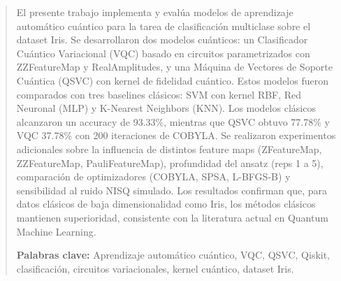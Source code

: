 \begin{abstract}
\noindent
El presente trabajo implementa y eval\'ua modelos de aprendizaje autom\'atico cu\'antico para la tarea de clasificaci\'on multiclase sobre el dataset Iris. Se desarrollaron dos modelos cu\'anticos: un Clasificador Cu\'antico Variacional (VQC) basado en circuitos parametrizados con ZZFeatureMap y RealAmplitudes, y una M\'aquina de Vectores de Soporte Cu\'antica (QSVC) con kernel de fidelidad cu\'antico. Estos modelos fueron comparados con tres baselines cl\'asicos: SVM con kernel RBF, Red Neuronal (MLP) y K-Nearest Neighbors (KNN). Los modelos cl\'asicos alcanzaron un accuracy de 93.33\%, mientras que QSVC obtuvo 77.78\% y VQC 37.78\% con 200 iteraciones de COBYLA. Se realizaron experimentos adicionales sobre la influencia de distintos feature maps (ZFeatureMap, ZZFeatureMap, PauliFeatureMap), profundidad del ansatz (reps 1 a 5), comparaci\'on de optimizadores (COBYLA, SPSA, L-BFGS-B) y sensibilidad al ruido NISQ simulado. Los resultados confirman que, para datos cl\'asicos de baja dimensionalidad como Iris, los m\'etodos cl\'asicos mantienen superioridad, consistente con la literatura actual en Quantum Machine Learning.

\vspace{0.5cm}
\noindent\textbf{Palabras clave:} Aprendizaje autom\'atico cu\'antico, VQC, QSVC, Qiskit, clasificaci\'on, circuitos variacionales, kernel cu\'antico, dataset Iris.
\end{abstract}
